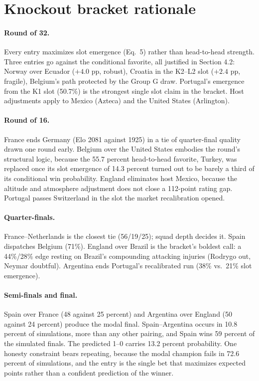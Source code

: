 \documentclass[11pt,letterpaper]{article}
\begin{document}
\section{Knockout bracket rationale}\label{app:bracket}

\paragraph{Round of 32.} Every entry maximizes slot emergence (Eq.~5) rather than head-to-head strength. Three entries go against the conditional favorite, all justified in Section 4.2: Norway over Ecuador ($+4.0$ pp, robust), Croatia in the K2--L2 slot ($+2.4$ pp, fragile), Belgium's path protected by the Group G draw. Portugal's emergence from the K1 slot (50.7\%) is the strongest single slot claim in the bracket. Host adjustments apply to Mexico (Azteca) and the United States (Arlington).

\paragraph{Round of 16.} France ends Germany (Elo 2081 against 1925) in a tie of quarter-final quality drawn one round early. Belgium over the United States embodies the round's structural logic, because the 55.7 percent head-to-head favorite, Turkey, was replaced once its slot emergence of 14.3 percent turned out to be barely a third of its conditional win probability. England eliminates host Mexico, because the altitude and atmosphere adjustment does not close a 112-point rating gap. Portugal passes Switzerland in the slot the market recalibration opened.

\paragraph{Quarter-finals.} France--Netherlands is the closest tie (56/19/25); squad depth decides it. Spain dispatches Belgium (71\%). England over Brazil is the bracket's boldest call: a 44\%/28\% edge resting on Brazil's compounding attacking injuries (Rodrygo out, Neymar doubtful). Argentina ends Portugal's recalibrated run (38\% vs.\ 21\% slot emergence).

\paragraph{Semi-finals and final.} Spain over France (48 against 25 percent) and Argentina over England (50 against 24 percent) produce the modal final. Spain--Argentina occurs in 10.8 percent of simulations, more than any other pairing, and Spain wins 59 percent of the simulated finals. The predicted 1--0 carries 13.2 percent probability. One honesty constraint bears repeating, because the modal champion fails in 72.6 percent of simulations, and the entry is the single bet that maximizes expected points rather than a confident prediction of the winner.
\end{document}
